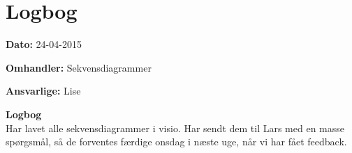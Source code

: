 \chapter{Logbog}

\textbf{Dato:} 24-04-2015

\textbf{Omhandler:} Sekvensdiagrammer

\textbf{Ansvarlige:} Lise

\textbf{Logbog}
\\
Har lavet alle sekvensdiagrammer i visio. Har sendt dem til Lars med en masse spørgsmål, så de forventes færdige onsdag i næste uge, når vi har fået feedback. 